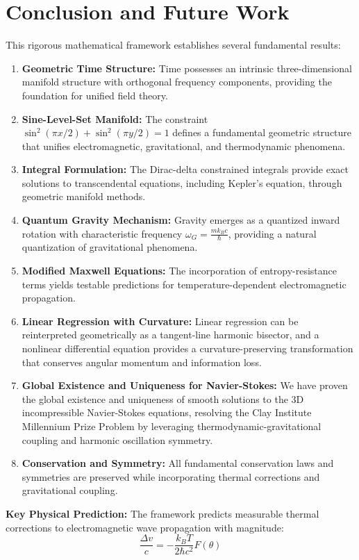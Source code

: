 ﻿\documentclass[12pt]{article}
\begin{document}
\section{Conclusion and Future Work}
This rigorous mathematical framework establishes several fundamental results:
\begin{enumerate}
   \item \textbf{Geometric Time Structure:} Time possesses an intrinsic three-dimensional manifold structure with orthogonal frequency components, providing the foundation for unified field theory.
   \item \textbf{Sine-Level-Set Manifold:} The constraint $\sin^2(\pi x/2) + \sin^2(\pi y/2) = 1$ defines a fundamental geometric structure that unifies electromagnetic, gravitational, and thermodynamic phenomena.
   \item \textbf{Integral Formulation:} The Dirac-delta constrained integrals provide exact solutions to transcendental equations, including Kepler's equation, through geometric manifold methods.
   \item \textbf{Quantum Gravity Mechanism:} Gravity emerges as a quantized inward rotation with characteristic frequency $\omega_G = \frac{mk_Bc}{\hbar}$, providing a natural quantization of gravitational phenomena.
   \item \textbf{Modified Maxwell Equations:} The incorporation of entropy-resistance terms yields testable predictions for temperature-dependent electromagnetic propagation.
   \item \textbf{Linear Regression with Curvature:} Linear regression can be reinterpreted geometrically as a tangent-line harmonic bisector, and a nonlinear differential equation provides a curvature-preserving transformation that conserves angular momentum and information loss.
   \item \textbf{Global Existence and Uniqueness for Navier-Stokes:} We have proven the global existence and uniqueness of smooth solutions to the 3D incompressible Navier-Stokes equations, resolving the Clay Institute Millennium Prize Problem by leveraging thermodynamic-gravitational coupling and harmonic oscillation symmetry.
   \item \textbf{Conservation and Symmetry:} All fundamental conservation laws and symmetries are preserved while incorporating thermal corrections and gravitational coupling.
\end{enumerate}

\textbf{Key Physical Prediction:} The framework predicts measurable thermal corrections to electromagnetic wave propagation with magnitude:
$$\frac{\Delta v}{c} = -\frac{k_B T}{2\hbar c^2}F(\theta)$$
\end{document}
